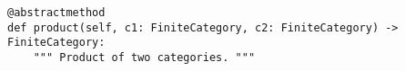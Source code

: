 \begin{verbatim}
@abstractmethod
def product(self, c1: FiniteCategory, c2: FiniteCategory) -> FiniteCategory:
    """ Product of two categories. """
\end{verbatim}